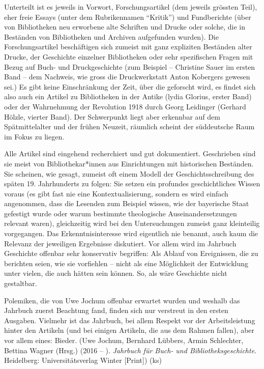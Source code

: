 \documentclass[a4paper,
fontsize=11pt,
oneside,
numbers=noperiodatend,
parskip=half-,
bibliography=totoc,
final
]{scrartcl}
\begin{document}
Unterteilt ist es jeweils in Vorwort, Forschungsartikel (dem jeweils
grössten Teil), eher freie Essays (unter dem Rubrikennamen
\enquote{Kritik}) und Fundberichte (über von Bibliotheken neu erworbene
alte Schriften und Drucke oder solche, die in Beständen von Bibliotheken
und Archiven aufgefunden wurden). Die Forschungsartikel beschäftigen
sich zumeist mit ganz expliziten Beständen alter Drucke, der Geschichte
einzelner Bibliotheken oder sehr spezifischen Fragen mit Bezug auf Buch-
und Druckgeschichte (zum Beispiel -- Christine Sauer im ersten Band --
dem Nachweis, wie gross die Druckwerkstatt Anton Kobergers gewesen sei.)
Es gibt keine Einschränkung der Zeit, über die geforscht wird, es findet
sich also auch ein Artikel zu Bibliotheken in der Antike (lydia Glorius,
erster Band) oder der Wahrnehmung der Revolution 1918 durch Georg
Leidinger (Gerhard Hölzle, vierter Band). Der Schwerpunkt liegt aber
erkennbar auf dem Spätmittelalter und der frühen Neuzeit, räumlich
scheint der süddeutsche Raum im Fokus zu liegen.

Alle Artikel sind eingehend recherchiert und gut dokumentiert.
Geschrieben sind sie meist von Bibliothekar*innen aus Einrichtungen mit
historischen Beständen. Sie scheinen, wie gesagt, zumeist oft einem
Modell der Geschichtsschreibung des späten 19. Jahrhunderts zu folgen:
Sie setzen ein profundes geschichtliches Wissen voraus (es gibt fast nie
eine Kontextualisierung, sondern es wird einfach angenommen, dass die
Lesenden zum Beispiel wissen, wie der bayerische Staat gefestigt wurde
oder warum bestimmte theologische Auseinandersetzungen relevant waren),
gleichzeitig wird bei den Untersuchungen zumeist ganz kleinteilig
vorgegangen. Das Erkenntnisinteresse wird eigentlich nie benannt, auch
kaum die Relevanz der jeweiligen Ergebnisse diskutiert. Vor allem wird
im Jahrbuch Geschichte offenbar sehr konservativ begriffen: Als Ablauf
von Ereignissen, die zu berichten seien, wie sie vorfiehlen -- nicht als
eine Möglichkeit der Entwicklung unter vielen, die auch hätten sein
können. So, als wäre Geschichte nicht gestaltbar.

Polemiken, die von Uwe Jochum offenbar erwartet wurden und weshalb das
Jahrbuch zuerst Beachtung fand, finden sich nur verstreut in den ersten
Ausgaben. Vielmehr ist das Jahrbuch, bei allem Respekt vor der
Arbeitsleistung hinter den Artikeln (und bei einigen Artikeln, die aus
dem Rahmen fallen), aber vor allem eines: Bieder. (Uwe Jochum, Bernhard
Lübbers, Armin Schlechter, Bettina Wagner (Hrsg.) (2016 -- ).
\emph{Jahrbuch für Buch- und Bibliotheksgeschichte}. Heidelberg:
Universitätsverlag Winter {[}Print{]}) (ks)
\end{document}
